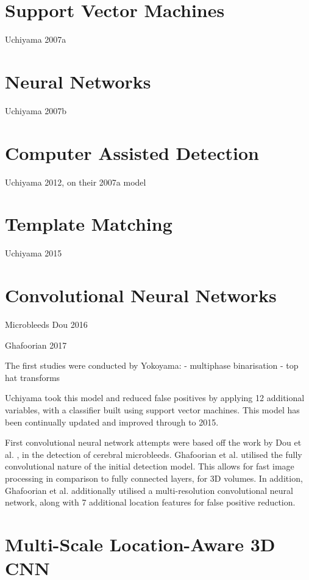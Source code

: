 \documentclass[honours,12pt]{unswthesis}
\numberwithin{equation}{section}
\begin{document}
\section{Support Vector Machines}

Uchiyama 2007a

\section{Neural Networks}

Uchiyama 2007b

\section{Computer Assisted Detection}

Uchiyama 2012, on their 2007a model

\section{Template Matching}

Uchiyama 2015

\section{Convolutional Neural Networks}

Microbleeds Dou 2016

Ghafoorian 2017

The first studies were conducted by Yokoyama:
 - multiphase binarisation
 - top hat transforms
 
 Uchiyama took this model and reduced false positives by applying 12 additional variables, with a classifier built using support vector machines. This model has been continually updated and improved through to 2015. 
 
First convolutional neural network attempts were based off the work by Dou et al. \cite{DouQ.2016ADoC}, in the detection of cerebral microbleeds. Ghafoorian et al. \cite{GhafoorianM.2017Dml3} utilised the fully convolutional nature of the initial detection model. This allows for fast image processing in comparison to fully connected layers, for 3D volumes. In addition, Ghafoorian et al. additionally utilised a multi-resolution convolutional neural network, along with 7 additional location features for false positive reduction.


\section{Multi-Scale Location-Aware 3D CNN}\label{litrev-paper1}
\end{document}
